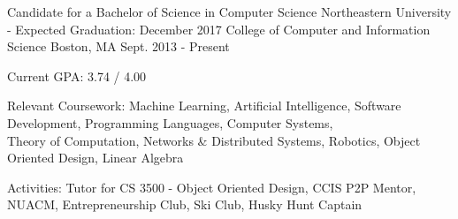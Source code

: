 


\begin{cventries}

  \cventry
    {Candidate for a Bachelor of Science in Computer Science} %
    {Northeastern University - Expected Graduation: December 2017 \newline College of Computer and Information Science} %
    {Boston, MA} %
    {Sept. 2013 - Present} %
    {
      \begin{cvitems} %
        \item {Current GPA: 3.74 / 4.00}
        \item {Relevant Coursework: Machine Learning, Artificial Intelligence, Software Development, Programming Languages, Computer Systems,\\
            \hspace*{3.11cm} Theory of Computation, Networks \& Distributed Systems, Robotics, Object Oriented Design, Linear Algebra}
        \item {Activities: Tutor for CS 3500 - Object Oriented Design, CCIS P2P Mentor, NUACM, Entrepreneurship Club, Ski Club, Husky Hunt Captain}
      \end{cvitems}
    }

\end{cventries}
